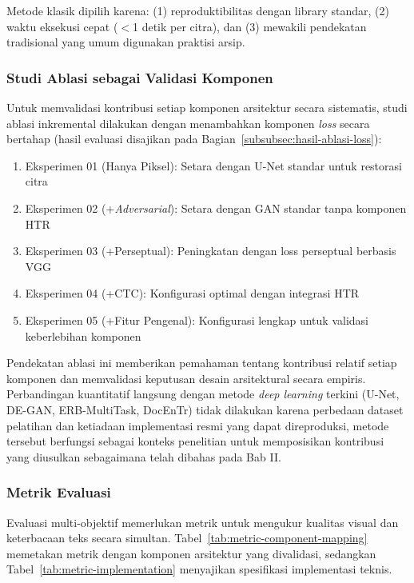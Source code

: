 Metode klasik dipilih karena: (1) reproduktibilitas dengan library standar, (2) waktu eksekusi cepat ($<$1 detik per citra), dan (3) mewakili pendekatan tradisional yang umum digunakan praktisi arsip.


\subsubsection{Studi Ablasi sebagai Validasi Komponen}

Untuk memvalidasi kontribusi setiap komponen arsitektur secara sistematis, studi ablasi inkremental dilakukan dengan menambahkan komponen \textit{loss} secara bertahap (hasil evaluasi disajikan pada Bagian~\ref{subsubsec:hasil-ablasi-loss}):

\begin{enumerate}[leftmargin=1.5em, labelsep=0.5em, itemindent=0pt, noitemsep, topsep=0pt]
  \item Eksperimen 01 (Hanya Piksel): Setara dengan U-Net standar untuk restorasi citra
  \item Eksperimen 02 (+\textit{Adversarial}): Setara dengan GAN standar tanpa komponen HTR
  \item Eksperimen 03 (+Perseptual): Peningkatan dengan loss perseptual berbasis VGG
  \item Eksperimen 04 (+CTC): Konfigurasi optimal dengan integrasi HTR
  \item Eksperimen 05 (+Fitur Pengenal): Konfigurasi lengkap untuk validasi keberlebihan komponen
\end{enumerate}

Pendekatan ablasi ini memberikan pemahaman tentang kontribusi relatif setiap komponen dan memvalidasi keputusan desain arsitektural secara empiris. Perbandingan kuantitatif langsung dengan metode \textit{deep learning} terkini (U-Net, DE-GAN, ERB-MultiTask, DocEnTr) tidak dilakukan karena perbedaan dataset pelatihan dan ketiadaan implementasi resmi yang dapat direproduksi, metode tersebut berfungsi sebagai konteks penelitian untuk memposisikan kontribusi yang diusulkan sebagaimana telah dibahas pada Bab II.

\subsubsection{Metrik Evaluasi}
\label{subsubsec:metrik-evaluasi}

Evaluasi multi-objektif memerlukan metrik untuk mengukur kualitas visual dan keterbacaan teks secara simultan. Tabel~\ref{tab:metric-component-mapping} memetakan metrik dengan komponen arsitektur yang divalidasi, sedangkan Tabel~\ref{tab:metric-implementation} menyajikan spesifikasi implementasi teknis.


